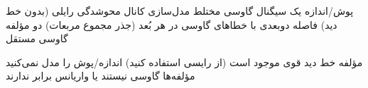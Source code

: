 
\lr{\PSyes{}} پوش/اندازه یک سیگنال گاوسی مختلط\PSbr{}\lr{\PSyes{}} مدل‌سازی کانال محوشدگی رایلی (بدون خط دید)\PSbr{}\lr{\PSyes{}} فاصله دوبعدی با خطاهای گاوسی در هر بُعد\PSbr{} (جذر مجموع مربعات) دو مؤلفه گاوسی مستقل


\PSno{} مؤلفه خط دید قوی موجود است (از رایسی استفاده کنید)\PSbr{}\PSno{} اندازه/پوش را مدل نمی‌کنید\PSbr{}\PSno{} مؤلفه‌ها گاوسی نیستند یا واریانس برابر ندارند



\begin{Shaded}
\begin{Highlighting}[]
 \OperatorTok{=} \OperatorTok{;}   
 \OperatorTok{=} \NormalTok{(}\OperatorTok{,} \OperatorTok{,} \NormalTok{)}\OperatorTok{;}

 \OperatorTok{=} \NormalTok{(}\OperatorTok{,} \NormalTok{)}\OperatorTok{;}
 \OperatorTok{=} \NormalTok{(}\OperatorTok{,} \NormalTok{)}\OperatorTok{;}

\OperatorTok{;}
\NormalTok{(}\OperatorTok{,}\OperatorTok{,}\NormalTok{)}\OperatorTok{;}
\NormalTok{(}\OperatorTok{,} \OperatorTok{,} \OperatorTok{,} \OperatorTok{,} \NormalTok{)}\OperatorTok{;}
\NormalTok{(}\NormalTok{)}\OperatorTok{;} \NormalTok{(}\NormalTok{)}\OperatorTok{;}
\NormalTok{(}\NormalTok{(}\OperatorTok{,} \NormalTok{))}\OperatorTok{;}
 \OperatorTok{;}


\end{Highlighting}
\end{Shaded}
